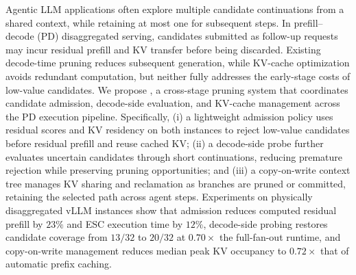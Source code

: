 Agentic LLM applications often explore multiple candidate continuations from a shared context, while retaining at most one for subsequent steps.
In prefill--decode (PD) disaggregated serving, candidates submitted as follow-up requests may incur residual prefill and KV transfer before being discarded.
Existing decode-time pruning reduces subsequent generation, while KV-cache optimization avoids redundant computation, but neither fully addresses the early-stage costs of low-value candidates.
We propose \sys, a cross-stage pruning system that coordinates candidate admission, decode-side evaluation, and KV-cache management across the PD execution pipeline.
Specifically, (i) a lightweight admission policy uses residual scores and KV residency on both instances to reject low-value candidates before residual prefill and reuse cached KV; (ii) a decode-side probe further evaluates uncertain candidates through short continuations, reducing premature rejection while preserving pruning opportunities; and (iii) a copy-on-write context tree manages KV sharing and reclamation as branches are pruned or committed, retaining the selected path across agent steps.
Experiments on physically disaggregated vLLM instances show that admission reduces computed residual prefill by $23\%$ and ESC execution time by $12\%$, decode-side probing restores candidate coverage from $13/32$ to $20/32$ at $0.70\times$ the full-fan-out runtime, and copy-on-write management reduces median peak KV occupancy to $0.72\times$ that of automatic prefix caching.
